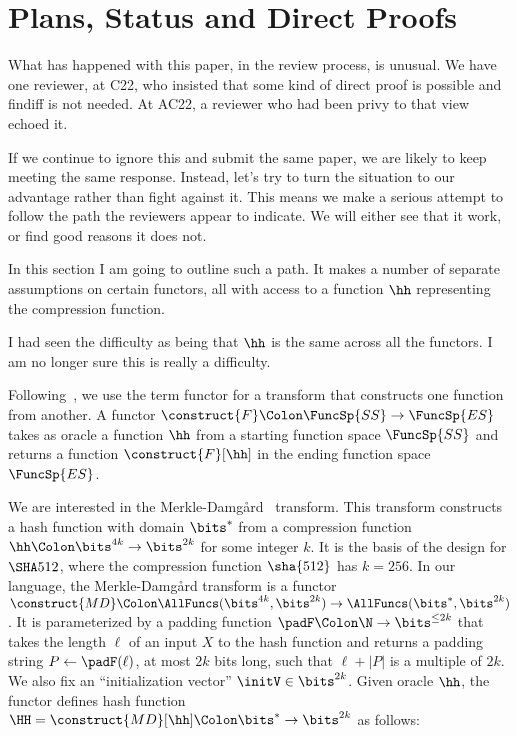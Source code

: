\section{Plans, Status and Direct Proofs}\label{sec-direct} 


What has happened with this paper, in the review process, is unusual. We have one reviewer, at C22, who insisted that some kind of direct proof is possible and findiff is not needed. At AC22, a reviewer who had been privy to that view echoed it. 

If we continue to ignore this and submit the same paper, we are likely to keep meeting the same response. Instead, let's try to turn the situation to our advantage rather than fight against it. This means we make a serious attempt to follow the path the reviewers appear to indicate. We will either see that it work, or find good reasons it does not.

In this section I am going to outline such a path. It makes a number of separate assumptions on certain functors, all with access to a function $\hh$ representing the compression function. 

I had seen the difficulty as being that $\hh$ is the same across all the functors. I am no longer sure this is really a difficulty.

 Following~\cite{EC:BelDavGun20}, we use the term functor for a transform that constructs one function from another. A functor $\construct{F}\Colon\FuncSp{SS}\to\FuncSp{ES}$ takes as oracle a function $\hh$ from a starting function space $\FuncSp{SS}$ and returns a function $\construct{F}[\hh]$ in the ending function space $\FuncSp{ES}$.


 We are interested in the Merkle-Damg{\aa}rd~\cite{C:Merkle89a,C:Damgaard89b} transform. This transform constructs a hash function with domain $\bits^*$ from a compression function $\hh\Colon\bits^{4k}\to\bits^{2k}$ for some integer $k$. It is the basis of the design for $\SHA512$, where the compression function $\sha{512}$ has $k=256$. In our language, the Merkle-Damg{\aa}rd transform is a functor $\construct{MD}\Colon \allowbreak \AllFuncs(\bits^{4k},\allowbreak \bits^{2k}) \allowbreak  \to \allowbreak  \AllFuncs(\bits^{*}, \allowbreak  \bits^{2k})$. It  is parameterized by a padding function $\padF\Colon \N  \to\bits^{\leq 2k}$ that takes the length $\ell$ of an input $X$ to the hash function and returns a padding string $P \gets \padF(\ell)$, at most $2k$ bits long, such that $\ell+|P|$ is a multiple of $2k$.
We also fix an ``initialization vector'' $\initV \in \bits^{2k}$. Given oracle $\hh$, the functor defines hash function $\HH = \construct{MD}[\hh]\Colon\bits^{*}\to\bits^{2k}$ as follows:

